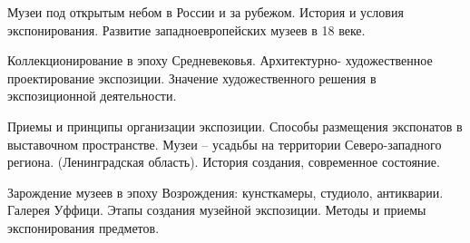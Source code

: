 \documentclass[
	14pt,
	a4paper,
	]
	{scrartcl}
\begin{document}
\vfill

\newpage


\shapk
{}
\setcounter{zad}{0}

\vfill
\z Музеи под открытым небом в России и за рубежом. История и условия экспонирования.
 \vfill
\z Развитие западноевропейских музеев в 18 веке.
 \vfill

\vfill

\newpage


\shapk
{}
\setcounter{zad}{0}

\vfill
\z Коллекционирование в эпоху Средневековья.
 \vfill
\z Архитектурно- художественное проектирование экспозиции. Значение художественного решения в экспозиционной деятельности.
 \vfill

\vfill

\newpage


\shapk
{}
\setcounter{zad}{0}

\vfill
\z Приемы и принципы организации экспозиции. Способы размещения экспонатов в выставочном пространстве.
 \vfill
\z Музеи – усадьбы на территории Северо-западного региона. (Ленинградская область). История создания, современное состояние.
 \vfill

\vfill

\newpage


\shapk
{}
\setcounter{zad}{0}

\vfill
\z Зарождение музеев в эпоху Возрождения: кунсткамеры, студиоло, антикварии. Галерея Уффици.
 \vfill
\z Этапы создания музейной экспозиции. Методы и приемы экспонирования предметов.
 \vfill

\vfill

\newpage
\end{document}

